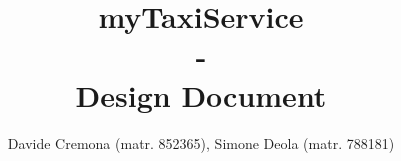 \documentclass{report}
\begin{document}
\title{\textbf{myTaxiService} \\-\\ \textbf{Design Document}}
\author{Davide Cremona (matr. 852365), Simone Deola (matr. 788181)}
 
\maketitle

\tableofcontents












 
\end{document}
